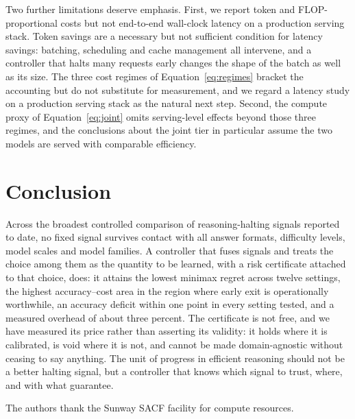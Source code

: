 \documentclass[acmsmall]{acmart}
\theoremstyle{acmdefinition}%
\theoremstyle{acmplain}}{}%
\begin{document}
Two further limitations deserve emphasis. First, we report token and FLOP-proportional costs but not end-to-end wall-clock latency on a production serving stack. Token savings are a necessary but not sufficient condition for latency savings: batching, scheduling and cache management all intervene, and a controller that halts many requests early changes the shape of the batch as well as its size. The three cost regimes of Equation~\eqref{eq:regimes} bracket the accounting but do not substitute for measurement, and we regard a latency study on a production serving stack as the natural next step. Second, the compute proxy of Equation~\eqref{eq:joint} omits serving-level effects beyond those three regimes, and the conclusions about the joint tier in particular assume the two models are served with comparable efficiency.

\section{Conclusion}\label{sec:conclusion}
Across the broadest controlled comparison of reasoning-halting signals reported to date, no fixed signal survives contact with all answer formats, difficulty levels, model scales and model families. A controller that fuses signals and treats the choice among them as the quantity to be learned, with a risk certificate attached to that choice, does: it attains the lowest minimax regret across twelve settings, the highest accuracy--cost area in the region where early exit is operationally worthwhile, an accuracy deficit within one point in every setting tested, and a measured overhead of about three percent. The certificate is not free, and we have measured its price rather than asserting its validity: it holds where it is calibrated, is void where it is not, and cannot be made domain-agnostic without ceasing to say anything. The unit of progress in efficient reasoning should not be a better halting signal, but a controller that knows which signal to trust, where, and with what guarantee.

\begin{acks}
The authors thank the Sunway SACF facility for compute resources.
\end{acks}



\end{document}
